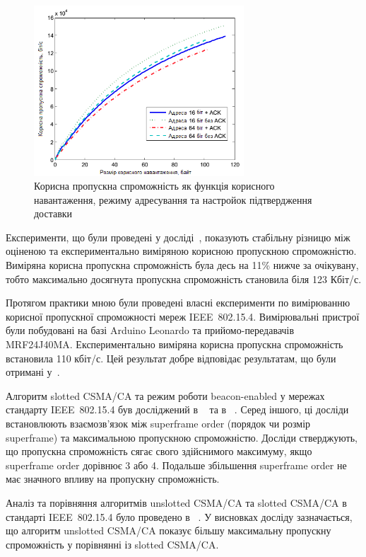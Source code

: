 \documentclass[a4paper,ukrainian,utf8,nocolumnsxix,nocolumnxxxii,nocolumnxxxi,floatsection,equationsection]{eskdtext}
\newcommand{\longcaption}[1]{\captionsetup{style=figureLongCaption}\caption{#1}}
\newcommand{\iee}[0]{IEEE~802.15.4\xspace}
\newcommand{\csma}[0]{CSMA/CA\xspace}
\newcommand{\ucsma}[0]{unslotted \csma\xspace}
\newcommand{\scsma}[0]{slotted \csma\xspace}
\newcommand{\bem}[0]{beacon-enabled\xspace}
\begin{document}
\begin{figure}[bth]
	\centering
	\includegraphics[width=0.7\textwidth]{img/throughput_graph.png}
	\longcaption{\label{fig:throughput_graph}Корисна пропускна спроможність як функція корисного навантаження, режиму адресування та настройок підтвердження доставки}
\end{figure}

Експерименти, що були проведені у досліді~\cite{thoroughput:analysis:unslotted:ieee}, показують стабільну різницю між оціненою та експериментально виміряною корисною пропускною спроможністю. Виміряна корисна пропускна спроможність була десь на 11\% нижче за очікувану, тобто максимально досягнута пропускна спроможність становила біля 123 Кбіт/с.

Протягом практики мною були проведені власні експерименти по вимірюванню корисної пропускної спроможності мереж \iee. Вимірювальні пристрої були побудовані на базі Arduino Leonardo та прийомо-передавачів MRF24J40MA. Експериментально виміряна корисна пропускна спроможність встановила 110 кбіт/с. Цей результат добре відповідає результатам, що були отримані у~\cite{thoroughput:analysis:unslotted:ieee}.

Алгоритм \scsma та режим роботи \bem у мережах стандарту \iee був досліджений в ~\cite{simulation:study:slotted:ieee} та в ~\cite{gts:allocation:analysis}. Серед іншого, ці досліди встановлюють взаємозв'язок між superframe order (порядок чи розмір superframe) та максимальною пропускною спроможністю. Досліди стверджують, що пропускна спроможність сягає свого здійснимого максимуму, якщо superframe order дорівнює 3 або 4. Подальше збільшення superframe order не має значного впливу на пропускну спроможність.

Аналіз та порівняння алгоритмів \ucsma та \scsma в стандарті \iee було проведено в ~\cite{analysis:slotted:unslotted}. У висновках досліду зазначається, що алгоритм \ucsma  показує більшу максимальну пропускну спроможність у порівнянні із \scsma.
\end{document}
